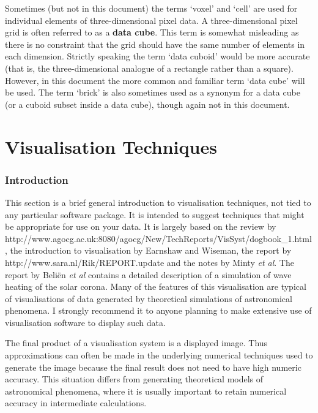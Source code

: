 Sometimes (but not in this document) the terms `voxel' and `cell' are 
used for individual elements of three-dimensional pixel data. A 
three-dimensional pixel grid is often referred to as a {\bf data cube}.
This term is somewhat misleading as there is no constraint that the grid 
should have the same number of elements in each dimension. Strictly 
speaking the term `data cuboid' would be more accurate (that is, the 
three-dimensional analogue of a rectangle rather than a square). However, 
in this document the more common and familiar term `data cube' will be used.
The term `brick' is also sometimes used as a synonym for a data cube (or
a cuboid subset inside a data cube), though again not in this document.


\cleardoublepage
\markboth{\stardocname}{\stardocname}
\part{Visualisation Techniques}
\markboth{\stardocname}{\stardocname}

\section{Introduction  }

This section is a brief general introduction to visualisation techniques,
not tied to any particular software package. It is intended to suggest
techniques that might be appropriate for use on your data. It is largely
based on the review by 
{http://www.agocg.ac.uk:8080/agocg/New/TechReports/VisSyst/dogbook_1.html}\cite{BRODLIE},
the introduction to visualisation by Earnshaw and Wiseman\cite{EARNSHAW}, 
the report by 
{http://www.sara.nl/Rik/REPORT.update}\cite{BELIEN} and the notes by 
Minty {\it et al}\cite{MINTY}. The report by Beli\"{e}n {\it et 
al}\cite{BELIEN} contains a detailed description of a simulation of wave
heating of the solar corona. Many of the features of this visualisation
are typical of visualisations of data generated by theoretical
simulations of astronomical phenomena. I strongly recommend it to anyone
planning to make extensive use of visualisation software to display such
data.

The final product of a visualisation system is a displayed image. Thus
approximations can often be made in the underlying numerical techniques
used to generate the image because the final result does not need to have
high numeric accuracy. This situation differs from generating
theoretical models of astronomical phenomena, where it is usually
important to retain numerical accuracy in intermediate calculations.

